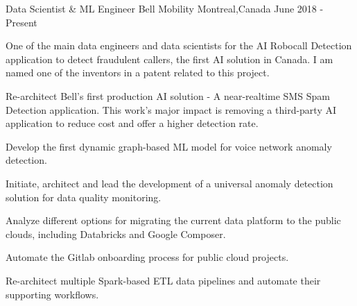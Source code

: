 \documentclass[11pt, a4paper]{awesome-cv} %
\begin{document}





\begin{cventries}
	
	\cventry
	{Data Scientist \& ML Engineer} %
	{Bell Mobility} %
	{Montreal,Canada} %
	{June 2018 - Present} %
	{ %
		\begin{cvitems}
		\item {One of the main data engineers and data scientists for the AI Robocall Detection application to detect fraudulent callers, the first AI solution in Canada. I am named one of the inventors in a patent related to this project.}
		\item {Re-architect Bell's first production AI solution - A near-realtime SMS Spam Detection application. This work's major impact is removing a third-party AI application to reduce cost and offer a higher detection rate.}
		\item {Develop the first dynamic graph-based ML model for voice network anomaly detection. }
		\item {Initiate, architect and lead the development of a universal anomaly detection solution for data quality monitoring.}
		\item {Analyze different options for migrating the current data platform to the public clouds, including Databricks and Google Composer.}
		\item {Automate the Gitlab onboarding process for public cloud projects.}
		\item {Re-architect multiple Spark-based ETL data pipelines and automate their supporting workflows.}
		\end{cvitems}
	}
	

\end{cventries}
\end{document}
